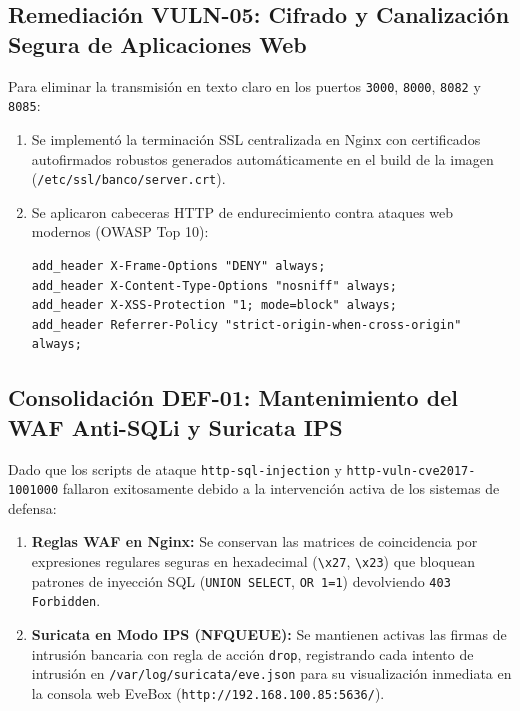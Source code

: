 \subsection{Remediación VULN-05: Cifrado y Canalización Segura de Aplicaciones Web}

Para eliminar la transmisión en texto claro en los puertos \texttt{3000}, \texttt{8000}, \texttt{8082} y \texttt{8085}:

\begin{enumerate}
  \item Se implementó la terminación SSL centralizada en Nginx con certificados autofirmados robustos generados automáticamente en el build de la imagen (\texttt{/etc/ssl/banco/server.crt}).
  \item Se aplicaron cabeceras HTTP de endurecimiento contra ataques web modernos (OWASP Top 10):
\begin{lstlisting}[style=terminal, caption={Cabeceras de Endurecimiento Web en Nginx}, label={lst:cabeceras-http}]
add_header X-Frame-Options "DENY" always;
add_header X-Content-Type-Options "nosniff" always;
add_header X-XSS-Protection "1; mode=block" always;
add_header Referrer-Policy "strict-origin-when-cross-origin" always;
\end{lstlisting}
\end{enumerate}

\subsection{Consolidación DEF-01: Mantenimiento del WAF Anti-SQLi y Suricata IPS}

Dado que los scripts de ataque \texttt{http-sql-injection} y \texttt{http-vuln-cve2017-1001000} fallaron exitosamente debido a la intervención activa de los sistemas de defensa:

\begin{enumerate}
  \item \textbf{Reglas WAF en Nginx:} Se conservan las matrices de coincidencia por expresiones regulares seguras en hexadecimal (\texttt{\textbackslash x27}, \texttt{\textbackslash x23}) que bloquean patrones de inyección SQL (\texttt{UNION SELECT}, \texttt{OR 1=1}) devolviendo \texttt{403 Forbidden}.
  \item \textbf{Suricata en Modo IPS (NFQUEUE):} Se mantienen activas las firmas de intrusión bancaria con regla de acción \texttt{drop}, registrando cada intento de intrusión en \texttt{/var/log/suricata/eve.json} para su visualización inmediata en la consola web EveBox (\texttt{http://192.168.100.85:5636/}).
\end{enumerate}
